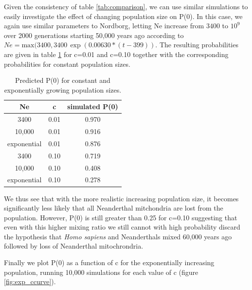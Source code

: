 \documentclass{article}
\begin{document}
Given the consistency of table \ref{tab:comparison}, we can use similar simulations to easily investigate the effect of changing population size on P(0). In this case, we again use similar parameters to Nordborg, letting Ne increase from $3400$ to $10^9$ over 2000 generations starting 50,000 years ago according to $Ne = \text{max}(3400, 3400 \, \exp{(0.00630*(t-399))}$. The resulting probabilities are given in table \ref{tab:expsim} for c=0.01 and c=0.10 together with the corresponding probabilities for constant population sizes.

\begin{table}[h]
\centering
\begin{tabular}{ |c c c |}
\hline
 Ne & c & simulated P(0) \\
\hline
3400 & 0.01 & 0.970 \\
10,000 & 0.01 & 0.916 \\
exponential & 0.01 &  0.876   \\
3400 & 0.10 &  0.719 \\
10,000 & 0.10 & 0.408 \\
exponential & 0.10 &  0.278 \\
\hline
\end{tabular}
\caption{Predicted P(0) for constant and exponentially growing population sizes.}
\label{tab:expsim}
\end{table}

We thus see that with the more realistic increasing population size, it becomes significantly less likely that all Neanderthal mitchondria are lost from the population. However, P(0) is still greater than 0.25 for c=0.10 suggesting that even with this higher mixing ratio we still cannot with high probability discard the hypothesis that \textit{Homo sapiens} and Neanderthals mixed 60,000 years ago followed by loss of Neanderthal mitochrondria.

Finally we plot P(0) as a function of c for the exponentially increasing population, running 10,000 simulations for each value of c (figure \ref{fig:exp_ccurve}).
\end{document}
